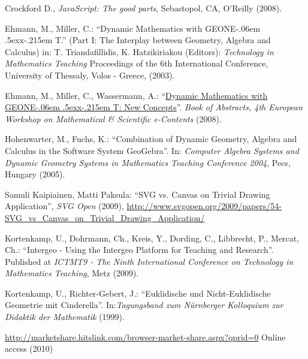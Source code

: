 \documentclass[12pt,a4paper]{article}%
\def\GEONExT{GEONE\kern-.06em \lower.5ex\hbox{x}\kern-.215em T}
\begin{document}
\begin{thebibliography}{99}
     Crockford D., \emph{JavaScript: The good parts}, Sebastopol, CA, O'Reilly (2008).
    
     Ehmann, M., Miller, C.: ``Dynamic Mathematics with \GEONExT.''
        (Part I: The Interplay between Geometry, Algebra and Calculus)
        in: T. Triandafillidis, K. Hatzikiriakou (Editors): \emph{Technology in Mathematics Teaching}
        Proceedings of the 6th International Conference, University of Thessaly, Volos - Greece, (2003).
 
     Ehmann, M., Miller, C., Wassermann, A.: 
        ``\href{http://jsxgraph.uni-bayreuth.de/talks/jsxgraphMathematical_and_Scientific_e-Contents.pdf}{Dynamic Mathematics with \GEONExT{}: New Concepts}''. 
        \emph{Book of Abstracts, 4th European Workshop on Mathematical \& Scientific e-Contents}
        (2008).   

     Hohenwarter, M., Fuchs, K.: 
        ``Combination of Dynamic Geometry, Algebra and Calculus in the Software System GeoGebra''.  
        In: \emph{Computer Algebra Systems and Dynamic Geometry Systems in Mathematics Teaching Conference 2004}, 
        Pecs, Hungary (2005).

     Samuli Kaipiainen, Matti Paksula: 
           ``SVG vs. Canvas on Trivial Drawing Application'', \emph{SVG Open} (2009),  
              \href{http://www.svgopen.org/2009/papers/54-SVG_vs_Canvas_on_Trivial_Drawing_Application/}{http://www.svgopen.org/2009/papers/54-SVG\_vs\_Canvas\_on\_Trivial\_Drawing\_Application/}

     Kortenkamp, U., Dohrmann, Ch., Kreis, Y., Dording, C., Libbrecht, P., Mercat, Ch.:
        ``Intergeo - Using the Intergeo Platform for Teaching and Research''. 
            Published at \emph{ICTMT9 - The Ninth International Conference on Technology in Mathematics Teaching},
            Metz (2009).

     Kortenkamp, U., Richter-Gebert, J.: 
        ``Euklidische und Nicht-Euklidische Geometrie mit Cinderella''. 
        In:\emph{Tagungsband zum N\"{u}rnberger Kolloquium zur Didaktik der Mathematik} (1999).
    
    
     \href{http://marketshare.hitslink.com/browser-market-share.aspx?qprid=0}{http://marketshare.hitslink.com/browser-market-share.aspx?qprid=0} Online access (2010)
    
\end{thebibliography}
\end{document}
